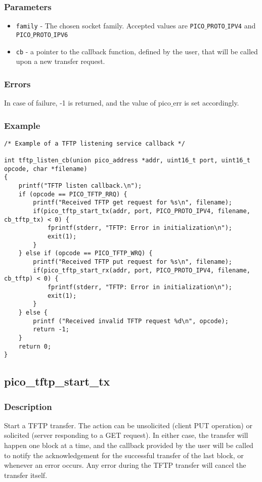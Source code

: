 \subsubsection*{Parameters}
\begin{itemize}[noitemsep]
\item \texttt{family} - The chosen socket family. Accepted values are \texttt{PICO$\_$PROTO$\_$IPV4} and \texttt{PICO$\_$PROTO$\_$IPV6}
\item \texttt{cb} - a pointer to the callback function, defined by the user, that will be called upon a new transfer request.
\end{itemize}

\subsubsection*{Errors}
In case of failure, -1 is returned, and the value of pico$\_$err
is set accordingly.

\subsubsection*{Example}

\begin{verbatim}
/* Example of a TFTP listening service callback */

int tftp_listen_cb(union pico_address *addr, uint16_t port, uint16_t opcode, char *filename)
{
    printf("TFTP listen callback.\n");
    if (opcode == PICO_TFTP_RRQ) {
        printf("Received TFTP get request for %s\n", filename);
        if(pico_tftp_start_tx(addr, port, PICO_PROTO_IPV4, filename, cb_tftp_tx) < 0) {
            fprintf(stderr, "TFTP: Error in initialization\n");
            exit(1);
        }
    } else if (opcode == PICO_TFTP_WRQ) {
        printf("Received TFTP put request for %s\n", filename);
        if(pico_tftp_start_rx(addr, port, PICO_PROTO_IPV4, filename, cb_tftp) < 0) {
            fprintf(stderr, "TFTP: Error in initialization\n");
            exit(1);
        }
    } else {
        printf ("Received invalid TFTP request %d\n", opcode);
        return -1;
    }
    return 0;
}

\end{verbatim}


\subsection{pico\_tftp\_start\_tx}

\subsubsection*{Description}
Start a TFTP transfer. The action can be unsolicited (client PUT operation) or solicited (server responding to a GET request).
In either case, the transfer will happen one block at a time, and the callback provided by the user will be called to notify the acknowledgement for the successful
transfer of the last block, or whenever an error occurs. Any error during the TFTP transfer will cancel the transfer itself.

